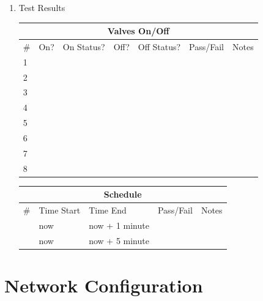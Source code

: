 \documentclass{article}
\begin{document}
\begin{enumerate}
\item Test Results \\
	\vspace{0.25in}
	\begin{tabular}{|l|l|l|l|l|l|c|}
		\hline
		\multicolumn{7}{|c|}{Valves On/Off} \\
		\hline
		\# & On? & On Status? & Off? & Off Status? & Pass/Fail & \hspace{0.7in}Notes\hspace{0.7in} \\
		\hline
		1 &&&&&& \\
		\hline
		2 &&&&&& \\
		\hline
		3 &&&&&& \\
		\hline
		4 &&&&&& \\
		\hline
		5 &&&&&& \\
		\hline
		6 &&&&&& \\
		\hline
		7 &&&&&& \\
		\hline
		8 &&&&&& \\
		\hline
	\end{tabular}

	\vspace{0.25in}
	\begin{tabular}{|l|l|l|l|l|}
		\hline
		\multicolumn{5}{|c|}{Schedule} \\
		\hline
		\# & Time Start & Time End & Pass/Fail & \hspace{0.5in}Notes\hspace{0.5in} \\
		\hline
		& now & now + 1 minute & & \\
		\hline
		& now & now + 5 minute & & \\
		\hline
	\end{tabular}

\end{enumerate}



\clearpage
\appendix

\section{Network Configuration}
\label{app:networking}

\end{document}
